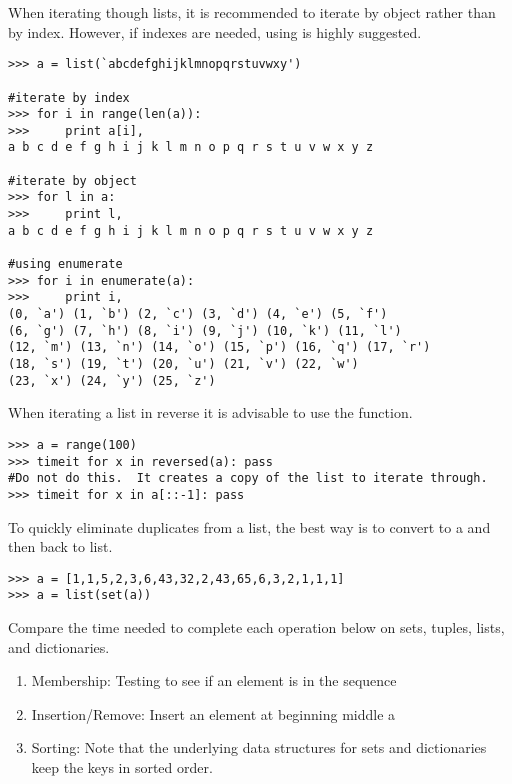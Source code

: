 When iterating though lists, it is recommended to iterate by object rather than by index.
However, if indexes are needed, using  is highly suggested.
\begin{lstlisting}
>>> a = list(`abcdefghijklmnopqrstuvwxy')

#iterate by index
>>> for i in range(len(a)):
>>>     print a[i],
a b c d e f g h i j k l m n o p q r s t u v w x y z

#iterate by object
>>> for l in a:
>>>     print l,
a b c d e f g h i j k l m n o p q r s t u v w x y z

#using enumerate
>>> for i in enumerate(a):
>>>     print i,
(0, `a') (1, `b') (2, `c') (3, `d') (4, `e') (5, `f') 
(6, `g') (7, `h') (8, `i') (9, `j') (10, `k') (11, `l') 
(12, `m') (13, `n') (14, `o') (15, `p') (16, `q') (17, `r') 
(18, `s') (19, `t') (20, `u') (21, `v') (22, `w') 
(23, `x') (24, `y') (25, `z')
\end{lstlisting}

When iterating a list in reverse it is advisable to use the  function.
\begin{lstlisting}
>>> a = range(100)
>>> timeit for x in reversed(a): pass
#Do not do this.  It creates a copy of the list to iterate through.
>>> timeit for x in a[::-1]: pass
\end{lstlisting}

To quickly eliminate duplicates from a list, the best way is to convert to a 
and then back to list.
\begin{lstlisting}
>>> a = [1,1,5,2,3,6,43,32,2,43,65,6,3,2,1,1,1]
>>> a = list(set(a))
\end{lstlisting}

\begin{problem}
Compare the time needed to complete each operation below on sets, tuples, lists, and dictionaries.
\begin{enumerate}
\item Membership: Testing to see if an element is in the sequence
\item Insertion/Remove: Insert an element at beginning middle a
\item Sorting: Note that the underlying data structures for sets and dictionaries keep the keys in sorted order.
\end{enumerate}

\end{problem}

